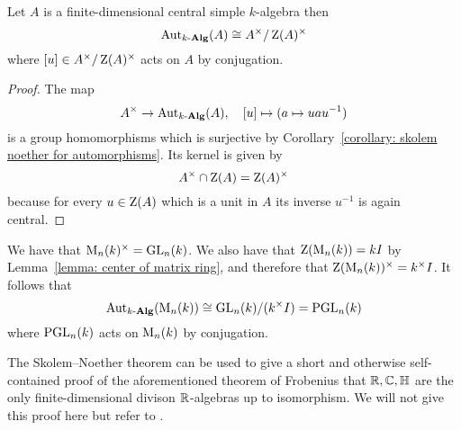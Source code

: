 \begin{corollary}
  Let $A$ is a finite-dimensional central simple $k$-algebra then
  \[
          \operatorname{Aut}_{k\text{-}\mathbf{Alg}}(A)
    \cong A^\times / \operatorname{Z}(A)^\times
  \]
  where $[u] \in A^\times / \operatorname{Z}(A)^\times$ acts on $A$ by conjugation.
\end{corollary}


\begin{proof}
  The map
  \[
            A^\times
    \to     \operatorname{Aut}_{k\text{-}\mathbf{Alg}}(A),
    \quad   [u]
    \mapsto (a \mapsto u a u^{-1})
  \]
  is a group homomorphisms which is surjective by Corollary~\ref{corollary: skolem noether for automorphisms}.
  Its kernel is given by
  \[
      A^\times \cap \operatorname{Z}(A)
    = \operatorname{Z}(A)^\times
  \]
  because for every $u \in \operatorname{Z}(A)$ which is a unit in $A$ its inverse $u^{-1}$ is again central.
\end{proof}


\begin{example}
  We have that $\operatorname{M}_n(k)^\times = \operatorname{GL}_n(k)$.
  We also have that $\operatorname{Z}(\operatorname{M}_n(k)) = k I$ by Lemma~\ref{lemma: center of matrix ring}, and therefore that $\operatorname{Z}(\operatorname{M}_n(k))^\times = k^\times I$.
  It follows that
  \[
          \operatorname{Aut}_{k\text{-}\mathbf{Alg}}(\operatorname{M}_n(k))
    \cong \operatorname{GL}_n(k) / (k^\times I)
    =     \operatorname{PGL}_n(k)
  \]
  where $\operatorname{PGL}_n(k)$ acts on $\operatorname{M}_n(k)$ by conjugation.
\end{example}


\begin{remark}
  The Skolem--Noether theorem can be used to give a short and otherwise self-contained proof of the aforementioned theorem of Frobenius that $\mathbb{R}, \mathbb{C}, \mathbb{H}$ are the only finite-dimensional divison $\mathbb{R}$-algebras up to isomorphism.
  We will not give this proof here but refer to \cite[Theorem 2.50]{Knapp2016Advanced}.
\end{remark}



